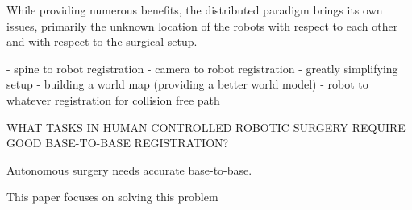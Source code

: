 



While providing numerous benefits, the distributed paradigm brings its own issues, primarily the unknown location of the robots with respect to each other and with respect to the surgical setup. 

- spine to robot registration
- camera to robot registration
- greatly simplifying setup
- building a world map (providing a better world model)
- robot to whatever registration for collision free path

WHAT TASKS IN HUMAN CONTROLLED ROBOTIC SURGERY REQUIRE GOOD BASE-TO-BASE REGISTRATION?

Autonomous surgery needs accurate base-to-base.

This paper focuses on solving this problem


~\cite{optas}
~\cite{point_cloud_based_robot_cell_calib}
~\citep{hand_eye_calibration_robotic_assisted}





